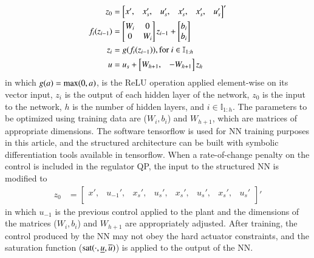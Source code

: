 \documentclass[preprint,5p, twocolumn, authoryear]{elsarticle}
\newcommand{\bbI}{\mathbb{I}}
\begin{document}
\begin{align*}
z_0 &= \begin{bmatrix}
    x', & x_s', & u_s', & x_s', & x_s', & u_s'
    \end{bmatrix}'\\
    f_i(z_{i-1}) &= \begin{bmatrix}
        W_i & 0 \\
        0 & W_i
          \end{bmatrix}z_{i-1}  + \begin{bmatrix}
            b_i \\
            b_i
            \end{bmatrix} \\
    z_i &= g(f_i(z_{i-1})), \textnormal{for} \ i \in \bbI_{1:h} \\
    u &= u_s + \begin{bmatrix}
  W_{h + 1}, & -W_{h + 1} \\
    \end{bmatrix} z_h \\
\end{align*}
in which $g(a) = \textnormal{max} (0, a)$,
is the ReLU operation applied element-wise on its vector input,
$z_i$ is the output of each hidden layer
of the network, $z_0$ is the input to the network, 
$h$ is the number of hidden layers, 
and $i \in \bbI_{1:h}$. The parameters 
to be optimized using training data are ($W_i, b_i$) 
and $W_{h+1}$, which are matrices 
of appropriate dimensions. The software tensorflow 
\citep{abadi:agarwal:barham:brevdo:et-al:2015} is used 
for NN training purposes in this article,
and the structured architecture can be built 
with symbolic differentiation tools available in tensorflow.
When a rate-of-change penalty on the control 
is included in the regulator QP, 
the input to the structured NN is modified to 
\begin{align*}
    z_0 &= 
    \begin{bmatrix}
    x', & u_{-1}', & x_s', & u_s', & x_s', & u_s', & x_s', & u_s' \\
    \end{bmatrix}'
\end{align*}
in which $u_{-1}$ is the previous control applied 
to the plant and the dimensions of the matrices 
($W_i, b_i$) and $W_{h+1}$ 
are appropriately adjusted. After 
training, the control produced by 
the NN may not obey the hard actuator constraints,
and the saturation function 
($\textnormal{sat}(\cdot, \underline{u}, \overline{u})$) 
is applied to the output of the NN.
\end{document}
